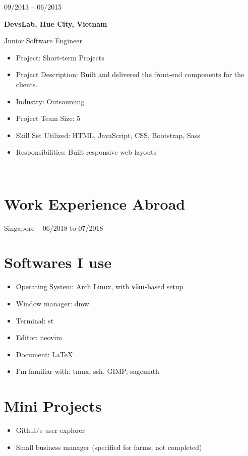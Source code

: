 \documentclass[10pt, letterpapaer]{article}
\let\oldhref\href
\renewcommand{\href}[3][blue]{\oldhref{#2}{\color{#1}{#3}}}
\newcommand{\bigentry}[3]{
\begin{minipage}[t]{.20\linewidth}
\hfill \textsc{#1}
\end{minipage}
\hfill\vline\hfill
\begin{minipage}[t]{.75\linewidth}
{\bf#2}\\{#3}
\end{minipage}\\
\vspace{.2cm}
}
\begin{document}
\bigentry{09/2013 – 06/2015}
{DevsLab, Hue City, Vietnam}
{Junior Software Engineer
\begin{itemize}
  \item Project: Short-term Projects
  \item Project Description: Built and delivered the front-end components for the clients.
  \item Industry: Outsourcing
  \item Project Team Size: 5
  \item Skill Set Utilized: HTML, JavaScript, CSS, Bootstrap, Sass
  \item Responsibilities: Built responsive web layouts
\end{itemize}}

\section{Work Experience Abroad}
Singapore – 06/2018 to 07/2018

\section{Softwares I use}
\begin{itemize}
  \item Operating System: Arch Linux, with \textbf{vim}-based setup
  \item Window manager: dmw
  \item Terminal: st
  \item Editor: neovim
  \item Document: \LaTeX
  \item I'm familiar with: tmux, ssh, GIMP, sagemath
\end{itemize}

\section{Mini Projects}
\begin{itemize}
  \item Github's user explorer \href{https://github-console.ngolam.xyz}{https://github-console.ngolam.xyz}
  \item Small business manager (specified for farms, not completed) \href{https://github.com/ngolamxyz/alfred}{https://github.com/ngolamxyz/alfred}
\end{itemize}
\end{document}

